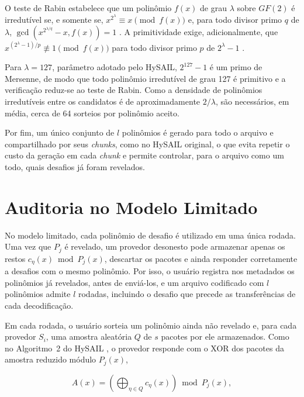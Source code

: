 O teste de Rabin estabelece que um polinômio $f(x)$ de grau $\lambda$ sobre $GF(2)$ é irredutível se, e somente se, $x^{2^\lambda} \equiv x \pmod{f(x)}$ e, para todo divisor primo $q$ de $\lambda$, $\gcd\left(x^{2^{\lambda/q}} - x, f(x)\right) = 1$ \cite{rabin1980probabilistic}. A primitividade exige, adicionalmente, que $x^{(2^\lambda - 1)/p} \not\equiv 1 \pmod{f(x)}$ para todo divisor primo $p$ de $2^\lambda - 1$ \cite{menezes1997handbook}.

Para $\lambda = 127$, parâmetro adotado pelo HySAIL, $2^{127} - 1$ é um primo de Mersenne, de modo que todo polinômio irredutível de grau 127 é primitivo e a verificação reduz-se ao teste de Rabin. Como a densidade de polinômios irredutíveis entre os candidatos é de aproximadamente $2/\lambda$, são necessários, em média, cerca de 64 sorteios por polinômio aceito.

Por fim, um único conjunto de $l$ polinômios é gerado para todo o arquivo e compartilhado por seus \emph{chunks}, como no HySAIL original, o que evita repetir o custo da geração em cada \emph{chunk} e permite controlar, para o arquivo como um todo, quais desafios já foram revelados.

\section{Auditoria no Modelo Limitado}
\label{sec:auditoria_limitada}

No modelo limitado, cada polinômio de desafio é utilizado em uma única rodada. Uma vez que $P_j$ é revelado, um provedor desonesto pode armazenar apenas os restos $c_\eta(x) \bmod P_j(x)$, descartar os pacotes e ainda responder corretamente a desafios com o mesmo polinômio. Por isso, o usuário registra nos metadados os polinômios já revelados, antes de enviá-los, e um arquivo codificado com $l$ polinômios admite $l$ rodadas, incluindo o desafio que precede as transferências de cada decodificação.

Em cada rodada, o usuário sorteia um polinômio ainda não revelado e, para cada provedor $S_i$, uma amostra aleatória $Q$ de $s$ pacotes por ele armazenados. Como no Algoritmo~2 do HySAIL \cite{amaral2019hysail}, o provedor responde com o XOR dos pacotes da amostra reduzido módulo $P_j(x)$,

\begin{equation}
	A(x) = \left(\bigoplus_{\eta \in Q} c_\eta(x)\right) \bmod P_j(x),
	\label{eq:desafio_xor}
\end{equation}

